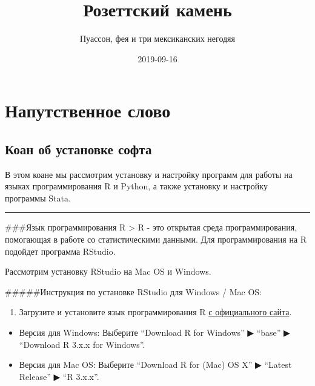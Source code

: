 \documentclass[]{book}
\title{Розеттский камень}
\author{Пуассон, фея и три мексиканских негодяя}
\date{2019-09-16}
\providecommand{\tightlist}{%
  \setlength{\itemsep}{0pt}\setlength{\parskip}{0pt}}
\begin{document}
\maketitle

{
\setcounter{tocdepth}{1}
\tableofcontents
}
\hypertarget{-}{%
\chapter{Напутственное слово}\label{-}}

\hypertarget{installsoft}{%
\section{Коан об установке софта}\label{installsoft}}

В этом коане мы рассмотрим установку и настройку программ для работы на языках программирования R и Python, а также установку и настройку программы Stata.

\begin{center}\rule{0.5\linewidth}{\linethickness}\end{center}

\#\#\#Язык программирования R
\textgreater{} R - это открытая среда программирования, помогающая в работе со статистическими данными. Для программирования на R подойдет программа RStudio.

Рассмотрим установку RStudio на Mac OS и Windows.

\#\#\#\#\#Инструкция по установке RStudio для Windows / Mac OS:

\begin{enumerate}
\def\labelenumi{\arabic{enumi}.}
\tightlist
\item
  Загрузите и установите язык программирования R \href{http://cran.cnr.berkeley.edu/}{с официального сайта}.
\end{enumerate}

\begin{itemize}
\item
  Версия для Windows: Выберите ``Download R for Windows'' ▶ ``base'' ▶ ``Download R 3.x.x for Windows''.
\item
  Версия для Mac OS: Выберите ``Download R for (Mac) OS X'' ▶ ``Latest Release'' ▶ ``R 3.x.x''.
\end{itemize}
\end{document}
